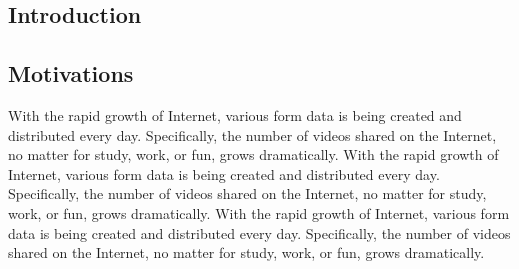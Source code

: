 \documentclass[a4paper,12pt,UTF8]{ctexart}
\begin{document}
\begin{spacing}{1.1}
\newpage
\rhead{\small\rightmark}
\tableofcontents

\newpage 
{}
\setcounter{page}{1}             
\section{Introduction}
\setcounter{table}{0}
\setcounter{figure}{0}
\subsection{Motivations}
With the rapid growth of Internet, various form data is being created and distributed every day. Specifically, the number of videos shared on the Internet, no matter for study, work, or fun, grows dramatically. With the rapid growth of Internet, various form data is being created and distributed every day. Specifically, the number of videos shared on the Internet, no matter for study, work, or fun, grows dramatically. 
\newline\indent With the rapid growth of Internet, various form data is being created and distributed every day. Specifically, the number of videos shared on the Internet, no matter for study, work, or fun, grows dramatically. 


\end{spacing}
\end{document}

